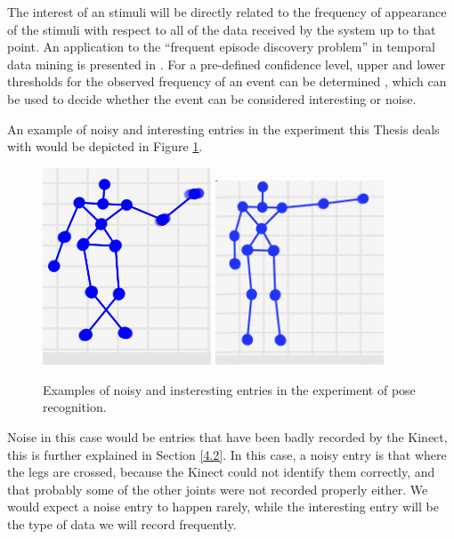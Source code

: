 The interest of an stimuli will be directly related to the frequency of appearance of the stimuli with respect to all of the data received by the system up to that point. An application to the “frequent episode discovery problem” in temporal data mining is presented in \cite{frequency}. For a pre-defined confidence level, upper and lower thresholds for the observed frequency of an event can be determined \cite{Pimentel2014}, which can be used to decide whether the event can be considered interesting or noise.

An example of noisy and interesting entries in the experiment this Thesis deals with would be depicted in Figure \ref{fig:noise}.

\begin{figure}[!htb]
  \includegraphics[width=5cm]{Figures/Noise}
  \centering
\endminipage\hfill
{}%
  \includegraphics[width=5cm]{Figures/Normal}
  \centering
\endminipage
  \caption{Examples of noisy and insteresting entries in the experiment of pose recognition. \label{fig:noise}}
\end{figure}

Noise in this case would be entries that have been badly recorded by the Kinect, this is further explained in Section \ref{4.2}. In this case, a noisy entry is that where the legs are crossed, because the Kinect could not identify them correctly, and that probably some of the other joints were not recorded properly either. We would expect a noise entry to happen rarely, while the interesting entry will be the type of data we will record frequently.

